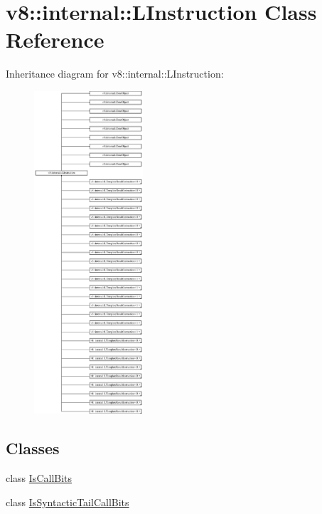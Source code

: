 \hypertarget{classv8_1_1internal_1_1_l_instruction}{}\section{v8\+:\+:internal\+:\+:L\+Instruction Class Reference}
\label{classv8_1_1internal_1_1_l_instruction}
Inheritance diagram for v8\+:\+:internal\+:\+:L\+Instruction\+:\begin{figure}[H]
\begin{center}
\leavevmode
\includegraphics[height=12.000000cm]{classv8_1_1internal_1_1_l_instruction}
\end{center}
\end{figure}
\subsection*{Classes}
\begin{DoxyCompactItemize}
\item 
class \hyperlink{classv8_1_1internal_1_1_l_instruction_1_1_is_call_bits}{Is\+Call\+Bits}
\item 
class \hyperlink{classv8_1_1internal_1_1_l_instruction_1_1_is_syntactic_tail_call_bits}{Is\+Syntactic\+Tail\+Call\+Bits}
\end{DoxyCompactItemize}
